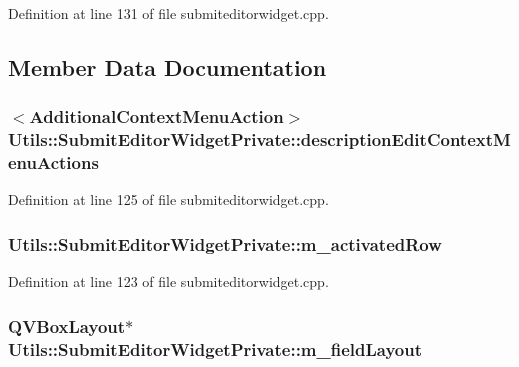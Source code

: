 Definition at line 131 of file submiteditorwidget.\-cpp.



\subsection{Member Data Documentation}
\hypertarget{struct_utils_1_1_submit_editor_widget_private_a789ad5be9463cbc80cdd09e3575050ca}{
\subsubsection[{description\-Edit\-Context\-Menu\-Actions}]{$<${\bf Additional\-Context\-Menu\-Action}$>$ Utils\-::\-Submit\-Editor\-Widget\-Private\-::description\-Edit\-Context\-Menu\-Actions}}\label{struct_utils_1_1_submit_editor_widget_private_a789ad5be9463cbc80cdd09e3575050ca}


Definition at line 125 of file submiteditorwidget.\-cpp.

\hypertarget{struct_utils_1_1_submit_editor_widget_private_a6827b630168b2e2696d7409ecfbb179f}{
\subsubsection[{m\-\_\-activated\-Row}]{ Utils\-::\-Submit\-Editor\-Widget\-Private\-::m\-\_\-activated\-Row}}\label{struct_utils_1_1_submit_editor_widget_private_a6827b630168b2e2696d7409ecfbb179f}


Definition at line 123 of file submiteditorwidget.\-cpp.

\hypertarget{struct_utils_1_1_submit_editor_widget_private_aec37bbec70dab7d4c0cf949fac9d2433}{
\subsubsection[{m\-\_\-field\-Layout}]{\setlength{\rightskip}{0pt plus 5cm}Q\-V\-Box\-Layout$\ast$ Utils\-::\-Submit\-Editor\-Widget\-Private\-::m\-\_\-field\-Layout}}\label{struct_utils_1_1_submit_editor_widget_private_aec37bbec70dab7d4c0cf949fac9d2433}


